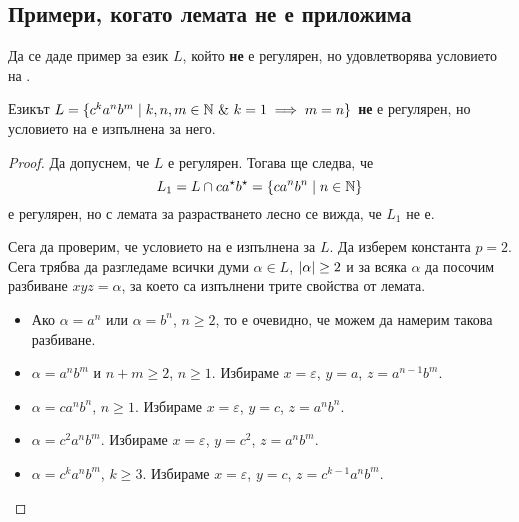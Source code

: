 \subsection*{Примери, когато лемата не е  приложима}

\begin{problem}
  Да се даде пример за език $L$, който {\bf не} е регулярен, но удовлетворява
  условието на .
\end{problem}



\begin{problem}
  Езикът $L = \{c^ka^nb^m\mid k,n,m \in \Nat\ \&\ k = 1\implies m = n\}$
  {\bf не} е регулярен, но условието на   е изпълнена за него.
\end{problem}
\begin{proof}
  Да допуснем, че $L$ е регулярен.
  Тогава ще следва, че 
  \[L_1 = L\cap ca^\star b^\star = \{ca^nb^n \mid n\in\mathbb{N}\}\]
  е регулярен,
  но с лемата за разрастването лесно се вижда, че $L_1$ не е.

  Сега да проверим, че условието на  е изпълнена за $L$.
  Да изберем константа $p = 2$.
  Сега трябва да разгледаме всички думи $\alpha \in L$, $\lvert{\alpha}\rvert \geq 2$
  и за всяка $\alpha$ да посочим разбиване $xyz = \alpha$, за което са изпълнени трите свойства от лемата.

  \begin{itemize}
  \item
    Ако $\alpha = a^n$ или $\alpha = b^n$, $n\geq 2$, то е  очевидно, че можем да
    намерим такова разбиване.
  \item
    $\alpha = a^nb^m$ и $n+m \geq 2$, $n \geq 1$.
    Избираме $x = \varepsilon$, $y = a$, $z = a^{n-1}b^m$.
  \item
    $\alpha = ca^nb^n$, $n\geq 1$.
    Избираме $x = \varepsilon$, $y = c$, $z = a^nb^n$.
  \item
    $\alpha = c^2a^nb^m$. 
    Избираме $x = \varepsilon$, $y = c^2$, $z = a^nb^m$.
  \item
    $\alpha = c^ka^nb^m$, $k \geq 3$.
    Избираме $x = \varepsilon$, $y = c$, $z = c^{k-1}a^nb^m$.
  \end{itemize}
\end{proof}

